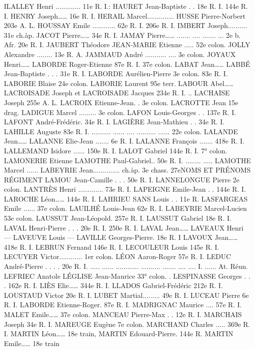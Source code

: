 \documentclass[a4paper,11pt]{book}
\begin{document}
ILALLEY Henri ............. 11e R. I.:
HAURET Jean-Baptiste . . 18e R. I.
144e R. I.
HENRY Joseph……
16e R. I.
HERAIL Marcel..............
HUSSE Pierre-Norbert 203e A. L.
HOUSSAY Emile ............ 62e R. I.
206e R. I.
IMBERT Joseph..........
31e ch.àp.
JACOT Pierre……
34e R. I.
JAMAY Pierre……
.......
....
.......
...
2e b. Afr.
20e R. I.
JAUBERT Théodore
JEAN-MARIE Etienne ..... 52e colon.
JOLLY Alexandre ........ 13e R. A.
JAMMAUD André ...........
....
3e colon.
JOYAUX Henri……
LABORDE Roger-Etienne 87e R. I.
37e colon.
LABAT Jean……
LABBÉ Jean-Baptiste . . . 31e R. I.
LABORDE Aurélien-Pierre 3e colon.
83e R. I.
LABORIE Blaise
24e colon.
LABORIE Laurent
95e terr.
LABOUR Abel……
LACROISADE Joseph et
LACROISADE Jacques
234e R. I.
..
LACHAISE Joseph
255e A. L.
LACROIX Etienne-Jean. . 3e colon.
LACROTTE Jean
15e drag.
LADIGUE Marcel .........
3e colon.
LAFON Louis-Georges . . 137e R. I.
LAFONT André-Frédéric. 34e R. I.
LAGIÈRE Jean-Mathieu . . 34e R. I.
LAHILLE Auguste
83e R. I.
..........
......
....
..........
......
22e colon.
LALANDE Jean……
LALANNE Elie-Jean ....... 6e R. I.
LALANNE François ....... 418e R. I.
LALLEMAND Isidore
......
150e R. I.
LALOT Gabriel
144e R. I.
7° colon.
LAMONERIE Etienne
LAMOTHE Paul-Gabriel.. 50e R. I.
........
.....
LAMOTHE Marcel ......
LABEYRIE Jean..............
ch.àp.
3e chass.
27eNOMS ET PRÉNOMS
RÉGIMENT
LAMOU Jean-Camille . . . 50e R. I.
LANNELONGUE Pierre
2e colon.
LANTRÈS Henri ............. 73e R. I.
LAPEIGNE Emile-Jean . . 144e R. I.
LAROCHE Léon……
144e R. I.
LAHRIEU SANS Louis . . 11e R.
LASFARGEAS Emile ...... 37e colon.
LAUILHÉ Louis-Jean
62e R. I.
LABEYRIE Marcel-Lucien 53e colon.
LAUSSUT Jean-Léopold. 257e R. I.
LAUSSUT Gabriel
18e R. I.
LAVAL Henri-Pierre . . . 20e R. I.
250e R. I.
LAVAL Jean……
LAVEAUX Henri
—
LAVEUVE Louis
—
LAVILLE Georges-Pierre. 18e R. I
LAVOUX Jean……
418e R. I.
LEBRUN Fernand
146e R. I.
LECOULEUR Louis
145e R. I.
LECUYER Victor............ 1er colon.
LÉON Aaron-Roger
57e R. I.
LEDUC André-Pierre . . . . 20e R.
I.
.....
......
............
..........
.......
....
....
I.
...... At. Réun.
LEFRIEC Anatole
LÉGLISE Jean-Maurice
33° colon.
.
LESPINASSE Georges . . . 162e R. I.
LIÈS Elie……
344e R. I.
LLADOS Gabriel-Frédéric 212e R. I.
LOUSTAUD Victor
20e R. I.
LUBET Martial.........
49e R. I.
LUCEAU Pierre
6e R. I.
LABORDE Etienne-Roger. 87e R. I.
MADRIGNAC Maurice .... 57e R. I.
MALET Emile……
37e colon.
MANCEAU Pierre-Max . . 12e R. I.
MARCHAIS Joseph
34e R. I.
MAREUGE Eugène
7e colon.
MARCHAND Charles ..... 369e R. I.
MARTIN Léon……
18e train,
MARTIN Edouard-Pierre. 144e R.
MARTIN Emile……
18e train
\end{document}
